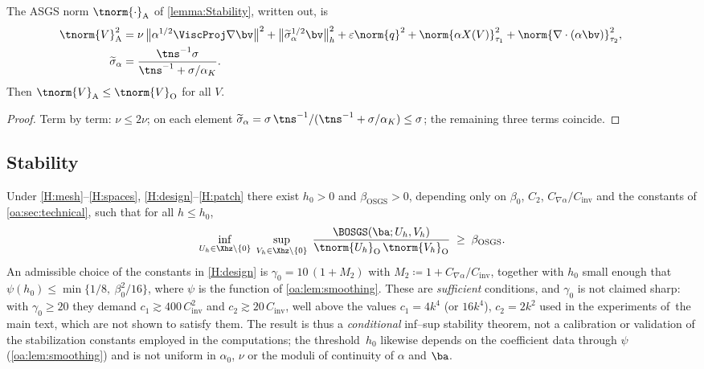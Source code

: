 \begin{lemma}
\label{oa:lem:normcomparison}
The ASGS norm $\tnorm{\cdot}_{\mathrm{A}}$ of \cref{lemma:Stability}, written out, is
\[
\begin{aligned}
  \tnorm{V}_{\mathrm{A}}^2
  &= \nu\,\bigl\lVert \alpha^{1/2}\ViscProj\nabla\bv \bigr\rVert^2
  + \bigl\lVert \widetilde{\sigma}_\alpha^{1/2}\bv \bigr\rVert_h^2
  + \varepsilon\norm{q}^2
  + \norm{\alpha X(V)}_{\tau_1}^2
  + \norm{\nabla\cdot(\alpha\bv)}_{\tau_2}^2,
  \qquad \\
  \widetilde{\sigma}_\alpha
  &= \frac{\tns^{-1}\sigma}{\tns^{-1} + \sigma/\alpha_K}.
\end{aligned}
\]
Then $\tnorm{V}_{\mathrm{A}} \le \tnorm{V}_{\mathrm{O}}$ for all $V$.
\end{lemma}

\begin{proof}
Term by term: $\nu \le 2\nu$; on each element
$\widetilde{\sigma}_\alpha = \sigma\,\tns^{-1}/(\tns^{-1}+\sigma/\alpha_K) \le \sigma$;
the remaining three terms coincide.
\end{proof}

\subsection{Stability}
\label{oa:sec:stability}

\begin{theorem}
\label{oa:th:stability}
Under \cref{H:mesh}--\cref{H:spaces}, \cref{H:design}--\cref{H:patch} there exist $h_0 > 0$ and $\beta_{\mathrm{OSGS}} > 0$,
depending only on $\beta_0$, $C_2$, $C_{\nabla\alpha}/C_{\mathrm{inv}}$ and the constants of
\cref{oa:sec:technical}, such that for all $h \le h_0$,
\begin{equation}
  \label{oa:eq:InfSup}
  \inf_{U_h \in \Xhz\setminus\{0\}}\;
  \sup_{V_h \in \Xhz\setminus\{0\}}\;
  \frac{\BOSGS(\ba; U_h, V_h)}{\tnorm{U_h}_{\mathrm{O}}\,\tnorm{V_h}_{\mathrm{O}}}
  \;\ge\; \beta_{\mathrm{OSGS}} .
\end{equation}
An admissible choice of the constants in \cref{H:design} is
$\gamma_0 = 10\,(1 + M_2)$ with $M_2 \coloneqq 1 + C_{\nabla\alpha}/C_{\mathrm{inv}}$,
together with $h_0$ small enough that
$\psi(h_0) \le \min\{1/8,\ \beta_0^2/16\}$, where $\psi$ is the function of
\cref{oa:lem:smoothing}. These are \emph{sufficient} conditions, and $\gamma_0$ is not claimed
sharp: with $\gamma_0 \ge 20$ they demand $c_1 \gtrsim 400\,C_{\mathrm{inv}}^2$ and
$c_2 \gtrsim 20\,C_{\mathrm{inv}}$, well above the values $c_1 = 4k^4$ (or $16k^4$),
$c_2 = 2k^2$ used in the experiments of~the main text, which are not shown to satisfy
them. The result is thus a \emph{conditional} inf--sup stability theorem, not a calibration
or validation of the stabilization constants employed in the computations; the
threshold~$h_0$ likewise depends on the coefficient data through $\psi$
(\cref{oa:lem:smoothing}) and is not uniform in $\alpha_0$, $\nu$ or the moduli of continuity
of $\alpha$ and $\ba$.
\end{theorem}

